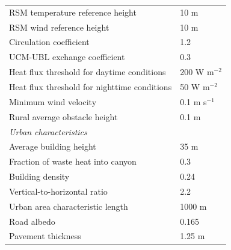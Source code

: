 \begin{table}[]
\begin{center}
\begin{tabular}{ll}
\hspace{12pt}RSM temperature reference height             & 10 m                    \\
\hspace{12pt}RSM wind reference height                    & 10 m                    \\
\hspace{12pt}Circulation coefficient                      & 1.2                     \\
\hspace{12pt}UCM-UBL exchange coefficient                 & 0.3                     \\
\hspace{12pt}Heat flux threshold for daytime conditions   & 200 W m$^{-2}$               \\
\hspace{12pt}Heat flux threshold for nighttime conditions & 50 W m$^{-2}$                \\
\hspace{12pt}Minimum wind velocity                        & 0.1 m s$^{-1}$               \\
\hspace{12pt}Rural average obstacle height \vspace{6pt}               & 0.1 m                   \\
\vspace{6pt}\textit{Urban characteristics}               &                         \\
\hspace{12pt}Average building height                      & 35 m                    \\
\hspace{12pt}Fraction of waste heat into canyon           & 0.3                     \\
\hspace{12pt}Building density                             & 0.24                    \\
\hspace{12pt}Vertical-to-horizontal ratio                 & 2.2                     \\
\hspace{12pt}Urban area characteristic length             & 1000 m                  \\
\hspace{12pt}Road albedo                                  & 0.165                   \\
\hspace{12pt}Pavement thickness                           & 1.25 m                  \\

\end{tabular}
\end{center}
\end{table}
